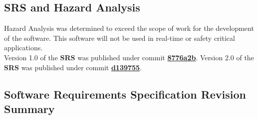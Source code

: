\documentclass{article}
\begin{document}
\subsection{SRS and Hazard Analysis}
Hazard Analysis was determined to exceed the scope of work for the development of the \progname{} software. This software will not be used in real-time or safety critical applications.\\ 

\noindent Version 1.0 of the \textbf{SRS} was published under commit \href{https://github.com/KiranSingh15/CAS-741-Image-Correspondences/commit/8776a2b2180b8d8d170e9e1b7e68392f4b424092#diff-135354e346cf609e826d36a28ad63746a7c537c4fcc1dec1663b35a4af2355f9}{\textbf{8776a2b}}. Version 2.0 of the \textbf{SRS} was published under commit \href{https://github.com/KiranSingh15/CAS-741-Image-Correspondences/commit/d139755d96b3c7b316cd7f96106ef69df3ab228a}{\textbf{d139755}}. 

\subsection*{Software Requirements Specification Revision Summary}
\end{document}
